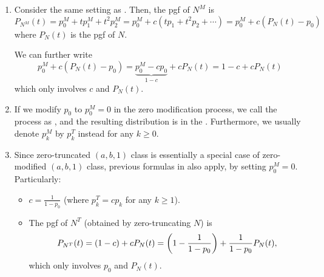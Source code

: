 \begin{enumerate}
\item \label{it:zm-pgf-fmlas}
Consider the same setting as . Then, the pgf
of \(N^M\) is
 \[
P_{N^M}(t)=p_0^M+tp_1^M+t^2p_2^M
=p_0^M+c(tp_1+t^2p_2+\dotsb)
=\boxed{p_0^M+c(P_N(t)-p_0)}
\]
where \(P_N(t)\) is the pgf of \(N\).

We can further write
\[
p_0^M+c(P_N(t)-p_0)
=\underbrace{p_0^M-cp_0}_{1-c}+cP_N(t)
=\boxed{1-c+cP_N(t)}
\]
which only involves \(c\) and \(P_N(t)\).

\item If we modify \(p_0\) to \(p_0^M=0\) in the zero modification process, we
call the process as , and the resulting distribution is
in the . Furthermore, we usually denote
\(p_k^M\) by \(p_k^T\) instead for any \(k\ge 0\).

\item \label{it:zt-fmlas}
Since zero-truncated \((a,b,1)\) class is essentially a special case of
zero-modified \((a,b,1)\) class, previous formulas in
 also apply, by
setting \(p_0^M=0\). Particularly:
\begin{itemize}
\item \(\displaystyle c=\frac{1}{1-p_0}\) (where \(p_k^T=cp_k\) for any \(k\ge 1\)).
\item The pgf of \(N^T\) (obtained by zero-truncating \(N\)) is
\[
P_{N^T}(t)=(1-c)+cP_N(t)=\qty(1-\frac{1}{1-p_0})+\frac{1}{1-p_0}P_N(t),
\]
which only involves \(p_0\) and \(P_N(t)\).
\end{itemize}
\end{enumerate}
